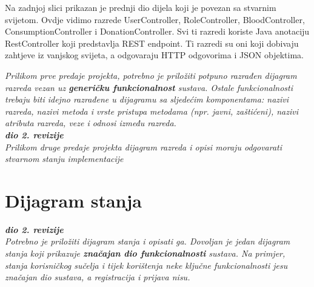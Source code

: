 
\eject

	Na zadnjoj slici prikazan je prednji dio  dijela koji je povezan sa stvarnim svijetom. Ovdje vidimo razrede UserController, RoleController, BloodController, ConsumptionController i DonationController. Svi ti razredi koriste Java anotaciju RestController koji predstavlja REST endpoint. Ti razredi su oni koji dobivaju zahtjeve iz vanjskog svijeta, a odgovaraju HTTP odgovorima i JSON objektima.
	

\eject
			
			\textit{Prilikom prve predaje projekta, potrebno je priložiti potpuno razrađen dijagram razreda vezan uz \textbf{generičku funkcionalnost} sustava. Ostale funkcionalnosti trebaju biti idejno razrađene u dijagramu sa sljedećim komponentama: nazivi razreda, nazivi metoda i vrste pristupa metodama (npr. javni, zaštićeni), nazivi atributa razreda, veze i odnosi između razreda.}\\
			
			\textbf{\textit{dio 2. revizije}}\\			
			
			\textit{Prilikom druge predaje projekta dijagram razreda i opisi moraju odgovarati stvarnom stanju implementacije}
			
			
			
			\eject
		
		\section{Dijagram stanja}
			
			
			\textbf{\textit{dio 2. revizije}}\\
			
			\textit{Potrebno je priložiti dijagram stanja i opisati ga. Dovoljan je jedan dijagram stanja koji prikazuje \textbf{značajan dio funkcionalnosti} sustava. Na primjer, stanja korisničkog sučelja i tijek korištenja neke ključne funkcionalnosti jesu značajan dio sustava, a registracija i prijava nisu. }
			
